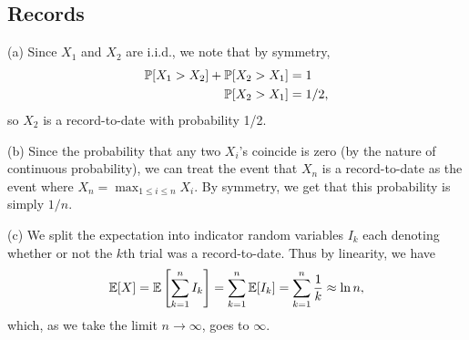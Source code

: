\subsection{Records}
(a) Since $X_1$ and $X_2$ are i.i.d., we note that by symmetry,
\begin{align*}
\P[X_1 > X_2] + \P[X_2 > X_1] &= 1 \\
\P[X_2 > X_1] &= 1/2,
\end{align*}
so $X_2$ is a record-to-date with probability 1/2.

(b) Since the probability that any two $X_i$'s coincide is zero (by the nature of continuous probability), we can treat the event that $X_n$ is a record-to-date as the event where $X_n = \max_{1 \leq i \leq n}X_i$. By symmetry, we get that this probability is simply $1/n$.

(c) We split the expectation into indicator random variables $I_k$ each denoting whether or not the $k$th trial was a record-to-date. Thus by linearity, we have
\[
\E[X] = \E\left[\sum_{k = 1}^n I_k\right] = \sum_{k = 1}^n\E[I_k] = \sum_{k = 1}^n \frac{1}{k} \approx \ln n,
\]
which, as we take the limit $n \to \infty$, goes to $\infty$.